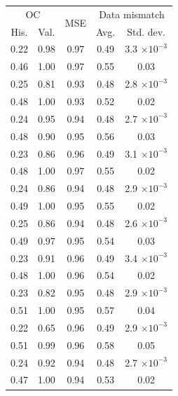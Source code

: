 \begin{tabular}{ccccc}
\toprule
\multicolumn{2}{c}{OC} & 
\multirow{2}{*}{
    MSE
} & 
\multicolumn{2}{c}{Data mismatch} 
\\
His. & Val. &  & Avg. & Std. dev.
\\
\midrule
0.22 & 0.98 & 0.97 & 0.49 & 3.3 $\times 10^{-3}$ \\
0.46 & 1.00 & 0.97 & 0.55 & 0.03 \\
\midrule
0.25 & 0.81 & 0.93 & 0.48 & 2.8 $\times 10^{-3}$ \\
0.48 & 1.00 & 0.93 & 0.52 & 0.02 \\
\midrule
0.24 & 0.95 & 0.94 & 0.48 & 2.7 $\times 10^{-3}$ \\
0.48 & 0.90 & 0.95 & 0.56 & 0.03 \\
\midrule
0.23 & 0.86 & 0.96 & 0.49 & 3.1 $\times 10^{-3}$ \\
0.48 & 1.00 & 0.97 & 0.55 & 0.02 \\
\midrule
0.24 & 0.86 & 0.94 & 0.48 & 2.9 $\times 10^{-3}$ \\
0.49 & 1.00 & 0.95 & 0.55 & 0.02 \\
\midrule
0.25 & 0.86 & 0.94 & 0.48 & 2.6 $\times 10^{-3}$ \\
0.49 & 0.97 & 0.95 & 0.54 & 0.03 \\
\midrule
0.23 & 0.91 & 0.96 & 0.49 & 3.4 $\times 10^{-3}$ \\
0.48 & 1.00 & 0.96 & 0.54 & 0.02 \\
\midrule
0.23 & 0.82 & 0.95 & 0.48 & 2.9 $\times 10^{-3}$ \\
0.51 & 1.00 & 0.95 & 0.57 & 0.04 \\
\midrule
0.22 & 0.65 & 0.96 & 0.49 & 2.9 $\times 10^{-3}$ \\
0.51 & 0.99 & 0.96 & 0.58 & 0.05 \\
\midrule
0.24 & 0.92 & 0.94 & 0.48 & 2.7 $\times 10^{-3}$ \\
0.47 & 1.00 & 0.94 & 0.53 & 0.02 \\
\bottomrule
\end{tabular}
